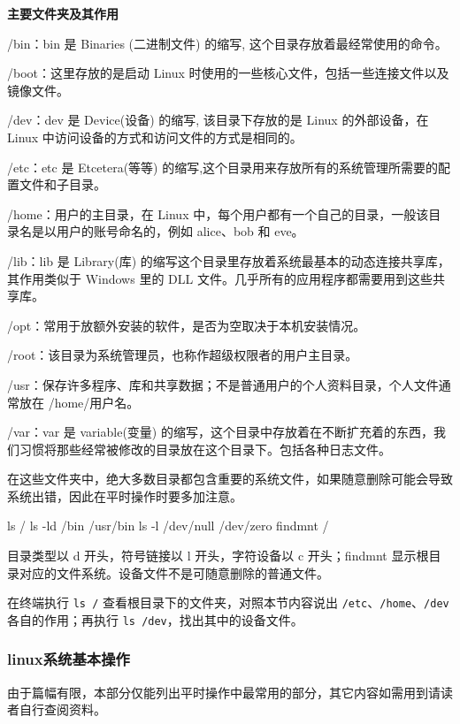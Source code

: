 \textbf{主要文件夹及其作用}

/bin：bin 是 Binaries (二进制文件) 的缩写, 这个目录存放着最经常使用的命令。

/boot：这里存放的是启动 Linux 时使用的一些核心文件，包括一些连接文件以及镜像文件。

/dev：dev 是 Device(设备) 的缩写, 该目录下存放的是 Linux 的外部设备，在 Linux 中访问设备的方式和访问文件的方式是相同的。

/etc：etc 是 Etcetera(等等) 的缩写,这个目录用来存放所有的系统管理所需要的配置文件和子目录。

/home：用户的主目录，在 Linux 中，每个用户都有一个自己的目录，一般该目录名是以用户的账号命名的，例如 alice、bob 和 eve。

/lib：lib 是 Library(库) 的缩写这个目录里存放着系统最基本的动态连接共享库，其作用类似于 Windows 里的 DLL 文件。几乎所有的应用程序都需要用到这些共享库。

/opt：常用于放额外安装的软件，是否为空取决于本机安装情况。

/root：该目录为系统管理员，也称作超级权限者的用户主目录。

/usr：保存许多程序、库和共享数据；不是普通用户的个人资料目录，个人文件通常放在 /home/用户名。

/var：var 是 variable(变量) 的缩写，这个目录中存放着在不断扩充着的东西，我们习惯将那些经常被修改的目录放在这个目录下。包括各种日志文件。

在这些文件夹中，绝大多数目录都包含重要的系统文件，如果随意删除可能会导致系统出错，因此在平时操作时要多加注意。

\begin{example}


\begin{tbash}
ls /
ls -ld /bin /usr/bin
ls -l /dev/null /dev/zero
findmnt /
\end{tbash}


目录类型以 d 开头，符号链接以 l 开头，字符设备以 c 开头；findmnt 显示根目录对应的文件系统。设备文件不是可随意删除的普通文件。
\end{example}
\begin{exercise}\label{ex:v1-fs-layout}
在终端执行 \texttt{ls /} 查看根目录下的文件夹，对照本节内容说出 \texttt{/etc}、\texttt{/home}、\texttt{/dev} 各自的作用；再执行 \texttt{ls /dev}，找出其中的设备文件。
\end{exercise}

\subsubsection{linux系统基本操作}
由于篇幅有限，本部分仅能列出平时操作中最常用的部分，其它内容如需用到请读者自行查阅资料。

